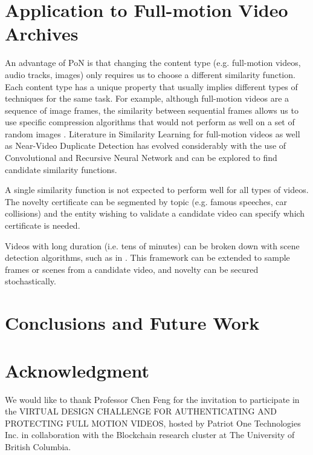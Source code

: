 \documentclass[conference]{IEEEtran}
\begin{document}
\section{Application to Full-motion Video Archives}
An advantage of PoN is that changing the content type (e.g. full-motion videos, audio tracks, images) only requires us to choose a different similarity function. Each content type has a unique property that usually implies different types of techniques for the same task. For example, although full-motion videos are a sequence of image frames, the similarity between sequential frames allows us to use specific compression algorithms that would not perform as well on a set of random images \cite{le1991mpeg}. Literature in Similarity Learning for full-motion videos as well as Near-Video Duplicate Detection \cite{li2019fast} has evolved considerably with the use of Convolutional and Recursive Neural Network \cite{saadatpanah2019adversarial} and can be explored to find candidate similarity functions.

A single similarity function is not expected to perform well for all types of videos. The novelty certificate can be segmented by topic (e.g. famous speeches, car collisions) and the entity wishing to validate a candidate video can specify which certificate is needed. 

Videos with long duration (i.e. tens of minutes) can be broken down with scene detection algorithms, such as in \cite{bui2019archangel}. This framework can be extended to sample frames or scenes from a candidate video, and novelty can be secured stochastically.

\section{Conclusions and Future Work}
\section*{Acknowledgment}
We would like to thank Professor Chen Feng for the invitation to participate in the VIRTUAL DESIGN CHALLENGE FOR AUTHENTICATING  AND  PROTECTING  FULL  MOTION  VIDEOS, hosted by Patriot One Technologies Inc. in collaboration with the Blockchain research cluster at The University of British Columbia.
{}

\end{document}
